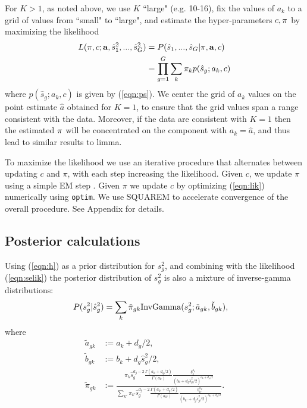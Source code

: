 \documentclass{bioinfo}
\begin{document}
\begin{methods}
For $K>1$, as noted above, we use $K$ ``large" (e.g. 10-16), fix the values of $a_k$ to a grid of values from ``small" to ``large", and estimate the hyper-parameters $c,\mathbf \pi$ by maximizing the likelihood
\begin{align}
L(\mathbf \pi, c;\mathbf a, \hat{s}_1^2,..., \hat{s}_G^2) &=P(\hat{s}_1,...,\hat{s}_G| \mathbf \pi,\mathbf a, c) \\ 
&=\prod\limits_{g=1}^G \sum_k \pi_k p(\hat{s}_g; a_k,c) \label{eqn:lik}
\end{align}
where $p(\hat{s}_g; a_k,c)$ is given by (\ref{eqn:ps}).
 We center the grid of $a_k$ values on the point estimate $\hat{a}$ obtained for $K=1$, to ensure that the grid values span a range consistent with the data. Moreover, if the data are consistent with $K=1$ then the estimated $\mathbf \pi$ will be concentrated on the component with $a_k=\hat{a}$, and thus lead to similar results to limma.
 
To maximize the likelihood we use an iterative procedure that alternates between updating $c$ and $\pi$, with each step increasing the likelihood. 
Given $c$, we update $\pi$ using a simple EM step \citep{dempster1977em}. Given $\pi$ we update $c$ by optimizing (\ref{eqn:lik}) numerically using {\tt optim}. We use SQUAREM \citep{varadhan2010squarem} to accelerate
convergence of the overall procedure. See Appendix for details.

\subsection{Posterior calculations}
Using (\ref{eqn:h}) as a prior distribution for $s_g^2$, and combining with the likelihood (\ref{eqn:selik}) the posterior distribution of $s_g^2$ is also a mixture of inverse-gamma distributions:
\begin{align}
P(s_g^2|\hat{s}_g^2) %
& =\sum_k \tilde{\pi}_{gk} \IG(s_g^2; \tilde{a}_{gk}, \tilde{b}_{gk}),
\end{align}
where
\begin{align}
\tilde{a}_{gk}&:=a_k+d_g/2 , \label{post}  \\
\tilde{b}_{gk}&:=b_k+d_g \hat{s}_g^2/2, \\
\tilde{\pi}_{gk}& := \frac{\pi_k \hat{s}_g^{d_g-2}\frac{\Gamma(a_k+d_g/2)}{\Gamma(a_k)}\frac{b_k^{a_k}}{(b_k+d_g\hat{s}_g^2/2)^{a_k+d_g/2}}}
{\sum_{k'} \pi_{k'} \hat{s}_g^{d_g-2}\frac{\Gamma(a_{k'}+d_g/2)}{\Gamma(a_{k'})}\frac{b_{k'}^{a_{k'}}}{(b_{k'}+d_g\hat{s}_g^2/2)^{a_{k'}+d_g/2}}}.   \label{eqn:postpi}
\end{align}


\end{methods}
\end{document}
